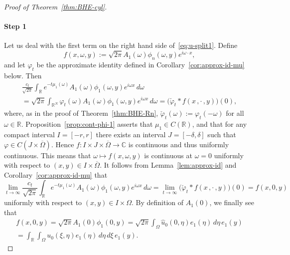 \documentclass[a4paper, reqno]{amsart}
\numberwithin{equation}{section}
\theoremstyle{plain}
\theoremstyle{definition}
\theoremstyle{remark}
\newcommand{\RR}{\mathbb{R}}
\newcommand{\CC}{\mathbb{C}}
\begin{document}
\begin{proof}[Proof of Theorem~\ref{thm:BHE-cyl}]
  \paragraph{Step 1}
  Let us deal with the first term on the right hand side of~\eqref{eq:u-split1}. Define
  \begin{equation*}
    f(x,\omega,y):=\sqrt{2\pi}A_1(\omega)\phi_n(\omega,y)e^{i\omega\cdot x},
  \end{equation*}
  and let $\varphi_t$ be the approximate identity defined in Corollary~\ref{cor:approx-id-mu} below. Then
  \begin{multline*}
    \frac{c_t}{\sqrt{2\pi}}\int_{\RR} e^{-t \mu_1(\omega)} A_1(\omega) \phi_1(\omega, y) e^{i\omega x} \,d\omega\\
    =\sqrt{2\pi}\int_{\RR^N}\varphi_t(\omega)A_1(\omega) \phi_1(\omega, y) e^{i\omega x} \,d\omega
    =\bigl(\check\varphi_t*f(x\,,\cdot\,,y)\bigr)(0),
  \end{multline*}
  where, as in the proof of Theorem~\ref{thm:BHE-Rn}, $\check\varphi_t(\omega):=\varphi_t(-\omega)$ for all $\omega\in\RR$.  Proposition~\ref{prop:cont-phi-1} asserts that $\mu_1\in C(\RR)$, and that for any compact interval $I=[-r,r]$ there exists an interval $J = [-\delta,\delta]$ such that $\varphi\in C(J\times\overline{\Omega})$. Hence $f\colon I\times J\times\overline{\Omega} \to \CC$ is continuous and thus uniformly continuous. This means that $\omega\mapsto f(x,\omega,y)$ is continuous at $\omega=0$ uniformly with respect to $(x,y)\in I\times\overline{\Omega}$. It follows from Lemma~\ref{lem:approx-id} and Corollary~\ref{cor:approx-id-mu} that
  \begin{equation*}
    \lim_{t\to\infty}\frac{c_t}{\sqrt{2\pi}}\int_{\RR} e^{-t \mu_1(\omega)} A_1(\omega) \phi_1(\omega, y) e^{i\omega x} \,d\omega
    =\lim_{t\to\infty}\bigl(\check\varphi_t*f(x\,,\cdot\,,y)\bigr)(0)
    =f(x,0,y)
  \end{equation*}
  uniformly with respect to $(x,y)\in I\times\Omega$. By definition of $A_1(0)$, we finally see that
  \begin{multline*}
    f(x,0,y)
    =\sqrt{2\pi}A_1(0)\phi_1(0,y)
    =\sqrt{2\pi}\int_{\Omega}\hat u_0(0,\eta)e_1(\eta)\,d\eta\, e_1(y)\\
    =\int_{\RR}\int_{\Omega}u_0(\xi,\eta)e_1(\eta)\,d\eta\,d\xi\, e_1(y).
  \end{multline*}


\end{proof}
\end{document}
